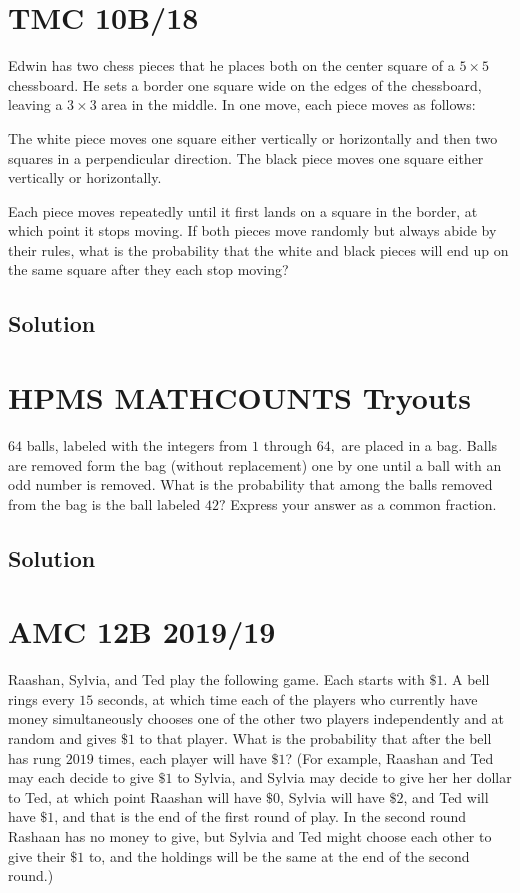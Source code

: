 \documentclass{article}
\begin{document}
\pagebreak\section{TMC 10B/18} Edwin has two chess pieces that he places both on the center square of a $5\times 5$ chessboard. He sets a border one square wide on the edges of the chessboard, leaving a $3\times 3$ area in the middle. In one move, each piece moves as follows:
    \begin{itemize}
\Item The white piece moves one square either vertically or horizontally and then two squares in a perpendicular direction.
\Item The black piece moves one square either vertically or horizontally.
\end{itemize}
Each piece moves repeatedly until it first lands on a square in the border, at which point it stops moving. If both pieces move randomly but always abide by their rules, what is the probability that the white and black pieces will end up on the same square after they each stop moving?
\subsection{Solution}    





\pagebreak\section{HPMS MATHCOUNTS Tryouts} $64$ balls, labeled with the integers from $1$ through $64,$ are placed in a bag. Balls are removed form the bag (without replacement) one by one until a ball with an odd number is removed. What is the probability that among the balls removed from the bag is the ball labeled $42?$ Express your answer as a common fraction.
\subsection{Solution}




\pagebreak\section{AMC 12B 2019/19} Raashan, Sylvia, and Ted play the following game. Each starts with $\$ 1$. A bell rings every $15$ seconds, at which time each of the players who currently have money simultaneously chooses one of the other two players independently and at random and gives $\$1$ to that player. What is the probability that after the bell has rung $2019$ times, each player will have $\$1$? (For example, Raashan and Ted may each decide to give $\$1$ to Sylvia, and Sylvia may decide to give her her dollar to Ted, at which point Raashan will have $\$0$, Sylvia will have $\$2$, and Ted will have $\$1$, and that is the end of the first round of play. In the second round Rashaan has no money to give, but Sylvia and Ted might choose each other to give their $\$1$ to, and the holdings will be the same at the end of the second round.)
\end{document}
